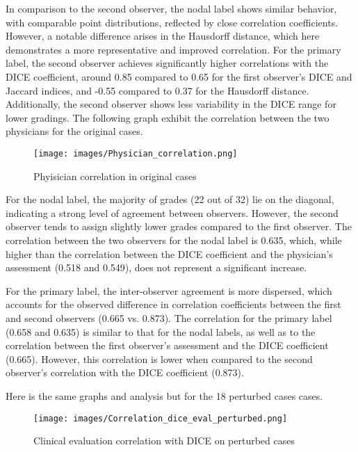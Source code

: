 In comparison to the second observer, the nodal label shows similar behavior, with comparable point distributions, reflected by close correlation coefficients. However, a notable difference arises in the Hausdorff distance, which here demonstrates a more representative and improved correlation. For the primary label, the second observer achieves significantly higher correlations with the DICE coefficient, around 0.85 compared to 0.65 for the first observer's DICE and Jaccard indices, and -0.55 compared to 0.37 for the Hausdorff distance. Additionally, the second observer shows less variability in the DICE range for lower gradings.
\newpage
The following graph exhibit the correlation between the two physicians for the original cases.
\begin{figure}[ht]
    \centering
    \texttt{[image: images/Physician\_correlation.png]}
    \caption{Phyisician correlation in original cases}
    \label{fig:three_subfigures}
\end{figure}

For the nodal label, the majority of grades (22 out of 32) lie on the diagonal, indicating a strong level of agreement between observers. However, the second observer tends to assign slightly lower grades compared to the first observer. The correlation between the two observers for the nodal label is 0.635, which, while higher than the correlation between the DICE coefficient and the physician’s assessment (0.518 and 0.549), does not represent a significant increase.

For the primary label, the inter-observer agreement is more dispersed, which accounts for the observed difference in correlation coefficients between the first and second observers (0.665 vs. 0.873). The correlation for the primary label (0.658 and 0.635) is similar to that for the nodal labels, as well as to the correlation between the first observer’s assessment and the DICE coefficient (0.665). However, this correlation is lower when compared to the second observer’s correlation with the DICE coefficient (0.873).\newpage  

Here is the same graphs and analysis but for the 18 perturbed cases cases.
\begin{figure}[ht]
    \centering
    \texttt{[image: images/Correlation\_dice\_eval\_perturbed.png]}
    \caption{Clinical evaluation correlation with DICE on perturbed cases}
    \label{fig:three_subfigures}
\end{figure}

